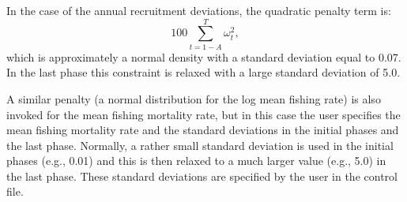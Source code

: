 In the case of the annual recruitment deviations, the quadratic penalty term is:\[ 100 \sum_{t=1-A}^T \omega_t^2,\] which is approximately a normal density with a standard deviation equal to 0.07.  In the last phase this constraint is relaxed with a large standard deviation of 5.0.

A similar penalty (a normal distribution for the log mean fishing rate) is also invoked for the mean fishing mortality rate, but in this case the user specifies the mean fishing mortality rate and the standard deviations in the initial phases and the last phase.  Normally, a rather small standard deviation is used in the initial phases (e.g., 0.01) and this is then relaxed to a much larger value (e.g., 5.0) in the last phase.  These standard deviations are specified by the user in the control file.

\clearpage
